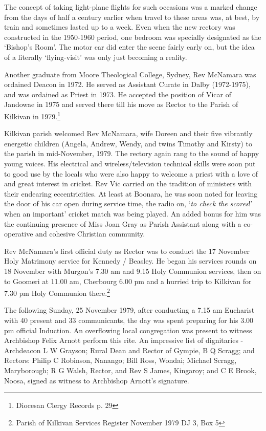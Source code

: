 The concept of taking light-plane flights for such occasions was a marked change from the days of half a century earlier when travel to these areas was, at best, by train and sometimes lasted up to a week. Even when the new rectory was constructed in the 1950-1960 period, one bedroom was specially designated as the `Bishop's Room'. The motor car did enter the scene fairly early on, but the idea of a literally `flying-visit' was only just becoming a reality.



Another graduate from Moore Theological College, Sydney, Rev McNamara was ordained Deacon in 1972. He served as Assistant Curate in Dalby (1972-1975), and was ordained as Priest in 1973. He accepted the position of Vicar of Jandowae in 1975 and served there till his move as Rector to the Parish of Kilkivan in 1979.\footnote{Diocesan Clergy Records p. 29}


Kilkivan parish welcomed Rev McNamara, wife Doreen and their five vibrantly energetic children (Angela, Andrew, Wendy, and twins Timothy and Kirsty) to the parish in mid-November, 1979. The rectory again rang to the sound of happy young voices. His electrical and wireless/television technical skills were soon put to good use by the locals who were also happy to welcome a priest with a love of and great interest in cricket. Rev Vic carried on the tradition of ministers with their endearing eccentricities. At least at Boonara, he was soon noted for leaving the door of his car open during service time, the radio on, `\emph{to check the scores}!' when an important' cricket match was being played. An added bonus for him was the continuing presence of Miss Joan Gray as Parish Assistant along with a co-operative and cohesive Christian community.



Rev McNamara's first official duty as Rector was to conduct the 17 November Holy Matrimony service for Kennedy / Beasley. He began his services rounds on 18 November with Murgon's 7.30 am and 9.15 Holy Communion services, then on to Goomeri at 11.00 am, Cherbourg 6.00 pm and a hurried trip to Kilkivan for 7.30 pm Holy Communion there.\footnote{Parish of Kilkivan Services Register November 1979 DJ 3, Box 5}


The following Sunday, 25 November 1979, after conducting a 7.15 am Eucharist with 40 present and 33 communicants, the day was spent preparing for his 3.00 pm official Induction. An overflowing local congregation was present to witness Archbishop Felix Arnott perform this rite. An impressive list of dignitaries - Archdeacon L W Grayson; Rural Dean and Rector of Gympie, B Q Scragg; and Rectors: Philip C Robinson, Nanango; Bill Ross, Wondai; Michael Scragg, Maryborough; R G Walsh, Rector, and Rev S James, Kingaroy; and C E Brook, Noosa, signed as witness to Archbishop Arnott's signature.



